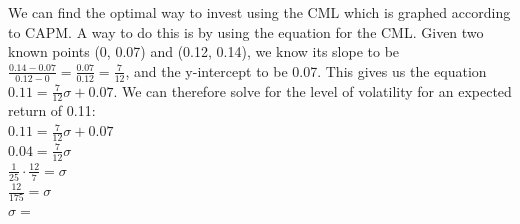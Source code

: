 \documentclass{article}
\begin{document}
{We can find the optimal way to invest using the CML which is graphed according to CAPM. A way to do this is by using the equation for the CML. Given two known points (0, 0.07) and (0.12, 0.14), we know its slope to be $\frac{0.14-0.07}{0.12 - 0} = \frac{0.07}{0.12} = \frac{7}{12}$, and the y-intercept to be 0.07. This gives us the equation $0.11 = \frac{7}{12}\sigma + 0.07$. We can therefore solve for the level of volatility for an expected return of 0.11: \\
$0.11 = \frac{7}{12}\sigma + 0.07$ \\
$0.04 = \frac{7}{12}\sigma$ \\
$\frac{1}{25} \cdot \frac{12}{7} = \sigma$ \\
$\frac{12}{175} = \sigma$ \\
$\sigma = $ 

}
\end{document}
